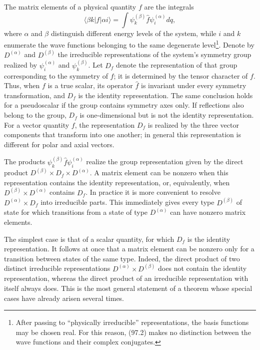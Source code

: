 The matrix elements of a physical quantity $f$ are the integrals
\begin{equation}
 \langle\beta k|f|\alpha i\rangle=\int\psi_k^{(\beta)}\widehat f\psi_i^{(\alpha)}dq,
 \tag{97.2}
\end{equation}
where $\alpha$ and $\beta$ distinguish different energy levels of the system,
while $i$ and $k$ enumerate the wave functions belonging to the same
degenerate level\footnote{After passing to ``physically irreducible''
representations, the basis functions may be chosen real. For this reason,
(97.2) makes no distinction between the wave functions and their complex
conjugates.}. Denote by $D^{(\alpha)}$ and $D^{(\beta)}$ the irreducible
representations of the system's symmetry group realized by
$\psi_i^{(\alpha)}$ and $\psi_k^{(\beta)}$. Let $D_f$ denote the
representation of that group corresponding to the symmetry of $f$; it is
determined by the tensor character of $f$. Thus, when $f$ is a true scalar,
its operator $\widehat f$ is invariant under every symmetry transformation,
and $D_f$ is the identity representation. The same conclusion holds for a
pseudoscalar if the group contains symmetry axes only. If reflections also
belong to the group, $D_f$ is one-dimensional but is not the identity
representation. For a vector quantity $f$, the representation $D_f$ is
realized by the three vector components that transform into one another;
in general this representation is different for polar and axial vectors.

The products $\psi_k^{(\beta)}\widehat f\psi_i^{(\alpha)}$ realize the group
representation given by the direct product
$D^{(\beta)}\times D_f\times D^{(\alpha)}$. A matrix element can be nonzero
when this representation contains the identity representation, or,
equivalently, when $D^{(\beta)}\times D^{(\alpha)}$ contains $D_f$. In
practice it is more convenient to resolve $D^{(\alpha)}\times D_f$ into
irreducible parts. This immediately gives every type $D^{(\beta)}$ of state
for which transitions from a state of type $D^{(\alpha)}$ can have nonzero
matrix elements.

The simplest case is that of a scalar quantity, for which $D_f$ is the
identity representation. It follows at once that a matrix element can be
nonzero only for a transition between states of the same type. Indeed, the
direct product of two distinct irreducible representations
$D^{(\alpha)}\times D^{(\beta)}$ does not contain the identity
representation, whereas the direct product of an irreducible representation
with itself always does. This is the most general statement of a theorem whose
special cases have already arisen several times.

